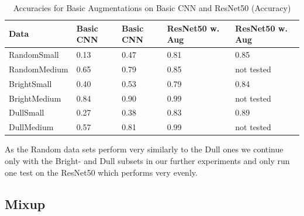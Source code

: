 \documentclass{article}
\begin{document}
\begin{table}[H]
	\caption{Accuracies for Basic Augmentations on Basic CNN and ResNet50 (Accuracy)}
	\label{sample-table}
	\centering
	\begin{tabular}{lllll}
		\toprule
		Data &  Basic CNN & Basic CNN & ResNet50 w. Aug & ResNet50 w. Aug\\
		\midrule
		RandomSmall  & 0.13 & 0.47 & 0.81 & 0.85 \\
		RandomMedium & 0.65 & 0.79 & 0.85 & not tested     \\
		BrightSmall  & 0.40 & 0.53 & 0.79 & 0.84 \\
		BrightMedium & 0.84 & 0.90 & 0.99 & not tested     \\
		DullSmall    & 0.27 & 0.38 & 0.83 & 0.89 \\
		DullMedium   & 0.57 & 0.81 & 0.99 & not tested     \\
		\bottomrule
	\end{tabular}
\end{table}





As the Random data sets perform very similarly to the Dull ones we continue only with the Bright- and Dull subsets in our further experiments and only run one test on the ResNet50 which performs very evenly. 

\subsection{Mixup}
\end{document}
